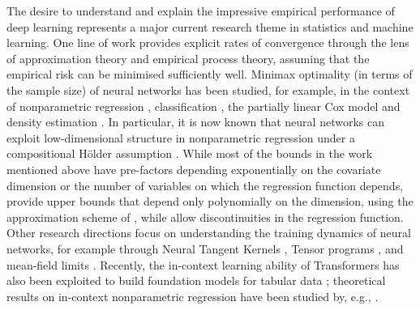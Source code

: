 \documentclass[12pt]{article}
\newcommand{\blue}[1]{\textcolor{blue}{#1}}
\begin{document}
The desire to understand and explain the impressive empirical performance of deep learning represents a major current research theme in statistics and machine learning.  One line of work provides explicit rates of convergence through the lens of approximation theory and empirical process theory, assuming that the empirical risk can be minimised sufficiently well. Minimax optimality (in terms of the sample size) of neural networks has been studied, for example, in the context of nonparametric regression \citep{bauer2019on,imaizumi2019deep,schmidt-hieber2020nonparametric,kohler2021rate,jiao2023deep,bhattacharya2023deep,fan2024factor}, classification \citep{bos2022convergence,zhang2024classification}, the partially linear Cox model \citep{zhong2022deep} and density estimation \citep{bos2024supervised}. In particular, it is now known that neural networks can exploit low-dimensional structure in nonparametric regression under a compositional H\"older assumption \citep{schmidt-hieber2020nonparametric,kohler2021rate}. While most of the bounds in the work mentioned above have pre-factors depending exponentially on the covariate dimension or the number of variables on which the regression function depends, \citet{jiao2023deep} provide upper bounds that depend only polynomially on the dimension, using the approximation scheme of \citet{lu2021deep}, while \citet{imaizumi2019deep} allow discontinuities in the regression function. Other research directions focus on understanding the training dynamics of neural networks, for example through Neural Tangent Kernels \citep{jacot2018neural,du2018gradient,arora2019exact}, Tensor programs \citep{yang2021tensor, littwin2023adaptive}, and mean-field limits \citep{chizat2018global, mei2018mean, mei2022generalization, suzuki2023convergence}. Recently, the in-context learning ability of Transformers has also been exploited to build foundation models for tabular data \citep{hollmann2025accurate}; theoretical results on in-context nonparametric regression have been studied by, e.g., \citet{kim2024transformers,ma2025optimal,ching2026efficient}.
\end{document}
